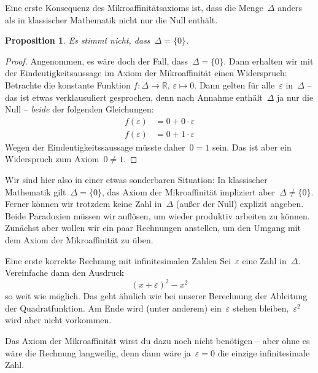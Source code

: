 \documentclass{zirkelblatt}
\newcommand{\RR}{\mathbb{R}}
\theoremstyle{definition}
\theoremstyle{plain}
\newtheorem{prop}[defn]{Proposition}
\theoremstyle{remark}
\begin{document}
Eine erste Konsequenz des Mikroaffinitätsaxioms ist, dass die Menge~$\Delta$
anders als in klassischer Mathematik nicht nur die Null enthält.
\begin{prop}\label{prop:neg-delta0}Es stimmt nicht, dass~$\Delta = \{ 0 \}$.\end{prop}
\begin{proof}Angenommen, es wäre doch der Fall, dass~$\Delta = \{ 0 \}$. Dann
erhalten wir mit der Eindeutigkeitsaussage im Axiom der Mikroaffinität einen
Widerspruch: Betrachte die konstante Funktion $f : \Delta \to \RR,\,\varepsilon \mapsto 0$.
Dann gelten für alle~$\varepsilon$ in~$\Delta$ -- das ist etwas verklausuliert
gesprochen, denn nach Annahme enthält~$\Delta$ ja nur die Null -- \emph{beide}
der folgenden Gleichungen:
\begin{align*}
  f(\varepsilon) &= 0 + 0 \cdot \varepsilon \\
  f(\varepsilon) &= 0 + 1 \cdot \varepsilon
\end{align*}
Wegen der Eindeutigkeitssaussage müsste daher~$0 = 1$ sein. Das ist aber ein
Widerspruch zum Axiom~$0 \neq 1$.
\end{proof}

Wir\marginpar[\hfill\dbend]{\dbend} sind hier also in einer etwas sonderbaren Situation: In klassischer
Mathematik gilt~$\Delta = \{ 0 \}$, das Axiom der Mikroaffinität impliziert
aber~$\Delta \neq \{ 0 \}$. Ferner können wir trotzdem keine Zahl
in~$\Delta$ (außer der Null) explizit angeben. Beide Paradoxien müssen wir
auflösen, um wieder produktiv arbeiten zu können. Zunächst aber wollen wir ein
paar Rechnungen anstellen, um den Umgang mit dem Axiom der Mikroaffinität zu
üben.

\begin{aufgabeShaded}{Eine erste korrekte Rechnung mit infinitesimalen Zahlen}
\label{aufg:erste-rechnung}
Sei~$\varepsilon$ eine Zahl in~$\Delta$. Vereinfache dann den Ausdruck
\[ (x + \varepsilon)^2 - x^2 \]
so weit wie möglich. Das geht ähnlich wie bei unserer Berechnung der Ableitung
der Quadratfunktion. Am Ende wird (unter anderem) ein~$\varepsilon$ stehen
bleiben,~$\varepsilon^2$ wird aber nicht vorkommen.

Das Axiom der Mikroaffinität wirst du dazu noch nicht benötigen -- aber ohne es
wäre die Rechnung langweilig, denn dann wäre ja~$\varepsilon = 0$ die einzige
infinitesimale Zahl.
\end{aufgabeShaded}
\end{document}
